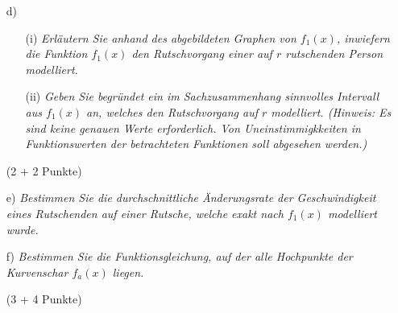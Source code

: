 \documentclass[ngerman, a4paper, 11pt]{article}
\begin{document}
\begin{figure}[h]
    \centering
\end{figure}

\begin{enumerate}
    \item[d)]
        \begin{enumerate}
            \item[(i)]
                \textit{Erläutern Sie anhand des abgebildeten Graphen von $f_{1}(x)$, inwiefern die Funktion $f_{1}(x)$ den Rutschvorgang einer auf $r$ rutschenden Person modelliert. }
            \item[(ii)]
                \textit{Geben Sie begründet ein im Sachzusammenhang sinnvolles Intervall aus $f_{1}(x)$ an, welches den Rutschvorgang auf $r$ modelliert. (Hinweis: Es sind keine genauen Werte erforderlich. Von Uneinstimmigkkeiten in Funktionswerten der betrachteten Funktionen soll abgesehen werden.)}
        \end{enumerate}
        \begin{flushright}
            (2 + 2 Punkte)
        \end{flushright}
\end{enumerate}

\begin{enumerate}
    \item[e)]
        \textit{Bestimmen Sie die durchschnittliche Änderungsrate der Geschwindigkeit eines Rutschenden auf einer Rutsche, welche exakt nach $f_{1}(x)$ modelliert wurde.}
    \item[f)]
        \textit{Bestimmen Sie die Funktionsgleichung, auf der alle Hochpunkte der Kurvenschar $f_{a}(x)$ liegen.}
        \begin{flushright}
            (3 + 4 Punkte)
        \end{flushright}
\end{enumerate}


\end{document}
